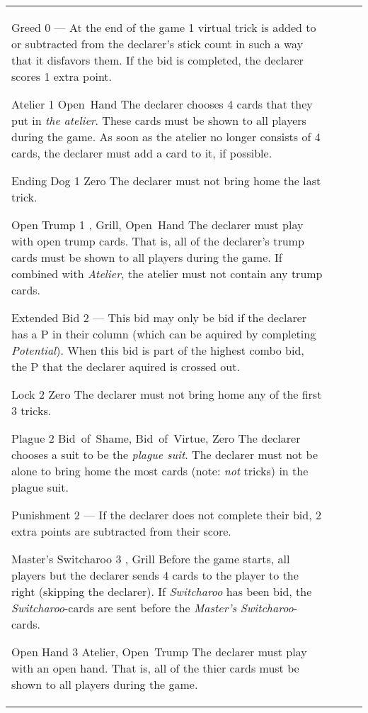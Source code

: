 \begin{table}
\begin{center}
\begin{tabularx}{\textwidth}{
			l
			S[table-number-alignment=center, table-figures-decimal=0]
			p{3cm}
			|X
		}
			\specialBidItem%
			{Greed}
			{0}
			{---}
			{%
				At the end of the game 1 virtual trick is added to or subtracted from the declarer's stick count in such a way that it disfavors them. If the bid is completed, the declarer scores 1 extra point.
			}

			\specialBidItem%
			{Atelier}
			{1}
			{Open~Hand}
			{%
				The declarer chooses 4 cards that they put in \emph{the atelier}. These cards must be shown to all players during the game. As soon as the atelier no longer consists of 4 cards, the declarer must add a card to it, if possible.
			}

			\specialBidItem%
			{Ending Dog}
			{1}
			{Zero}
			{%
				The declarer must not bring home the last trick.
			}

			\specialBidItem%
			{Open Trump}
			{1}
			{\nonTrump, Grill, Open~Hand}
			{%
				The declarer must play with open trump cards. That is, all of the declarer’s trump cards must be shown to all players during the game. If combined with \emph{Atelier}, the atelier must not contain any trump cards.
			}

			\specialBidItem%
			{Extended Bid}
			{2}
			{---}
			{%
				This bid may only be bid if the declarer has a P in their column (which can be aquired by completing \emph{Potential}). When this bid is part of the highest combo bid, the P that the declarer aquired is crossed out.
			}

			\specialBidItem%
			{Lock}
			{2}
			{Zero}
			{%
				The declarer must not bring home any of the first 3 tricks.
			}

			\specialBidItem%
			{Plague}
			{2}
			{Bid~of~Shame, Bid~of~Virtue, Zero}
			{%
				The declarer chooses a suit to be the \emph{plague suit}. The declarer must not be alone to bring home the most cards (note: \emph{not} tricks) in the plague suit.
			}

			\specialBidItem%
			{Punishment}
			{2}
			{---}
			{%
				If the declarer does not complete their bid, 2 extra points are subtracted from their score.
			}

			\specialBidItem%
			{Master's Switcharoo}
			{3}
			{\nonTrump, Grill}
			{%
				Before the game starts, all players but the declarer sends 4 cards to the player to the right (skipping the declarer). If \emph{Switcharoo} has been bid, the \emph{Switcharoo}-cards are sent before the \emph{Master's Switcharoo}-cards.
			}

			\specialBidItem%
			{Open Hand}
			{3}
			{Atelier, Open~Trump}
			{%
				The declarer must play with an open hand. That is, all of the thier cards must be shown to all players during the game.
			}
		\end{tabularx}
	\end{center}
\end{table}
